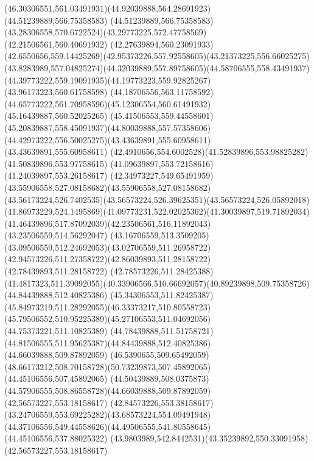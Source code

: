 {{\curveto(46.30306551,561.03491931)(44.92039888,564.28691923)(44.51239889,566.75358583)
\curveto(44.51239889,566.75358583)(43.28306558,570.6722524)(43.29773225,572.47758569)
\lineto(42.21506561,560.40691932)
\lineto(42.27639894,560.23091933)
\curveto(42.6550656,559.14425269)(42.95373226,557.92558605)(43.21373225,556.66025275)
\curveto(43.8283989,557.04825274)(44.32039889,557.89758605)(44.58706555,558.43491937)
\curveto(44.39773222,559.19091935)(44.19773223,559.92825267)(43.96173223,560.61758598)
\lineto(44.18706556,563.11758592)
\curveto(44.65773222,561.70958596)(45.12306554,560.61491932)(45.16439887,560.52025265)
\curveto(45.41506553,559.44558601)(45.20839887,558.45091937)(44.80039888,557.57358606)
\curveto(44.42973222,556.50025275)(43.43639891,555.60958611)(43.43639891,555.60958611)
\curveto(42.4910656,554.6002528)(41.52839896,553.98825282)(41.50839896,553.97758615)
\lineto(41.09639897,553.72158616)
\lineto(41.24039897,553.26158617)
\curveto(42.34973227,549.65491959)(43.55906558,527.08158682)(43.55906558,527.08158682)
\curveto(43.56173224,526.7402535)(43.56573224,526.39625351)(43.56573224,526.05892018)
\curveto(41.86973229,524.1495869)(41.09773231,522.02025362)(41.30039897,519.71892034)
\curveto(41.46439896,517.87092039)(42.23506561,516.11892043)(43.23506559,514.56292047)
\curveto(43.16706559,513.3509205)(43.09506559,512.24692053)(43.02706559,511.26958722)
\curveto(42.94573226,511.27358722)(42.86039893,511.28158722)(42.78439893,511.28158722)
\lineto(42.78573226,511.28425388)
\curveto(41.4817323,511.39092055)(40.33906566,510.66692057)(40.89239898,509.75358726)
\moveto(44.84439888,512.40825386)
\curveto(45.34306553,511.82425387)(45.84973219,511.28292055)(46.33373217,510.80558723)
\curveto(45.79506552,510.95225389)(45.27106553,511.04692056)(44.75373221,511.10825389)
\curveto(44.78439888,511.51758721)(44.81506555,511.95625387)(44.84439888,512.40825386)
\moveto(44.66039888,509.87892059)
\curveto(46.5390655,509.65492059)(48.66173212,508.70158728)(50.73239873,507.45892065)
\lineto(44.45106556,507.45892065)
\curveto(44.50439889,508.0375873)(44.57906555,508.86558728)(44.66039888,509.87892059)
\moveto(42.56573227,553.18158617)
\curveto(42.84573226,553.38158617)(43.24706559,553.69225282)(43.68573224,554.09491948)
\curveto(44.37106556,549.44558626)(44.49506555,541.80558645)(44.45106556,537.88025322)
\curveto(43.9803989,542.8442531)(43.35239892,550.33091958)(42.56573227,553.18158617)
}
}
